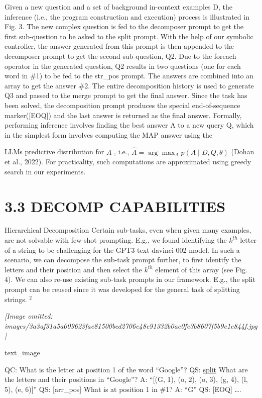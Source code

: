 \documentclass[
]{article}
\begin{document}
Given a new question and a set of background in-context examples D, the
inference (i.e., the program construction and execution) process is
illustrated in Fig. 3. The new complex question is fed to the decomposer
prompt to get the first sub-question to be asked to the split prompt.
With the help of our symbolic controller, the answer generated from this
prompt is then appended to the decomposer prompt to get the second
sub-question, Q2. Due to the foreach operator in the generated question,
Q2 results in two questions (one for each word in \#1) to be fed to the
str\_pos prompt. The answers are combined into an array to get the
answer \#2. The entire decomposition history is used to generate Q3 and
passed to the merge prompt to get the final answer. Since the task has
been solved, the decomposition prompt produces the special
end-of-sequence marker({[}EOQ{]}) and the last answer is returned as the
final answer. Formally, performing inference involves finding the best
answer A to a new query Q, which in the simplest form involves computing
the MAP answer using the

LLMs predictive distribution for \(A\) , i.e.,
\(\hat{A} = \arg \max_A p(A \mid D, Q, \theta)\) (Dohan et al., 2022).
For practicality, such computations are approximated using greedy search
in our experiments.

\section{3.3 DECOMP CAPABILITIES}\label{decomp-capabilities}

Hierarchical Decomposition Certain sub-tasks, even when given many
examples, are not solvable with few-shot prompting. E.g., we found
identifying the \(k^{th}\) letter of a string to be challenging for the
GPT3 text-davinci-002 model. In such a scenario, we can decompose the
sub-task prompt further, to first identify the letters and their
position and then select the \(k^{th}\) element of this array (see Fig.
4). We can also re-use existing sub-task prompts in our framework. E.g.,
the split prompt can be reused since it was developed for the general
task of splitting strings. \(^{2}\)

\textit{[Image omitted: images/3a3af31a5a009623fae81500bed2706e48e91332b0ac0fe3b8607f5b9e1e844f.jpg]}

text\_image

QC: What is the letter at position 1 of the word ``Google''? QS:
\hyperref[split]{split} What are the letters and their positions in
``Google''? A: ``{[}(G, 1), (o, 2), (o, 3), (g, 4), (l, 5), (e, 6){]}''
QS: {[}arr\_pos{]} What is at position 1 in \#1? A: ``G'' QS: {[}EOQ{]}
\ldots.
\end{document}
